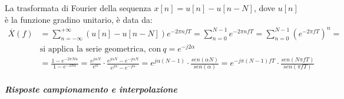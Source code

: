 \documentclass[
]{article}
\begin{document}
\begin{enumerate}
  La trasformata di Fourier della sequenza \(x[n]=u[n]-u[n-N]\), dove
  \(u[n]\) è la funzione gradino unitario, è data da: \begin{align*}
  \displaystyle \overline{X}(f) &= \sum_{n = -\infty}^{+\infty} (u[n]-u[n-N])e^{-2\pi nfT} = \sum_{n = 0}^{N-1}e^{-2\pi nfT} = \sum_{n = 0}^{N-1}(e^{-2\pi fT})^n = \\
  &\text{si applica la serie geometrica, con} \ q = e^{-j2\alpha}& \\
  &= \frac{1-e^{-2\pi N\alpha}}{1-e^{-2\pi \alpha}} = \frac{e^{j \alpha N}}{e^{\alpha}} \cdot \frac{e^{j\alpha N} - e^{-j\alpha N}}{e^{j\alpha } - e^{-j\alpha }} = e^{j \alpha (N-1)} \cdot \frac{sen(\alpha N)}{sen(\alpha)} = e^{-j\pi (N-1)fT} \cdot \frac{sen(N\pi fT)}{sen(\pi fT)}
  \end{align*}
\end{enumerate}

\subparagraph{Risposte campionamento e
interpolazione}\label{risposte-campionamento-e-interpolazione}
\end{document}
